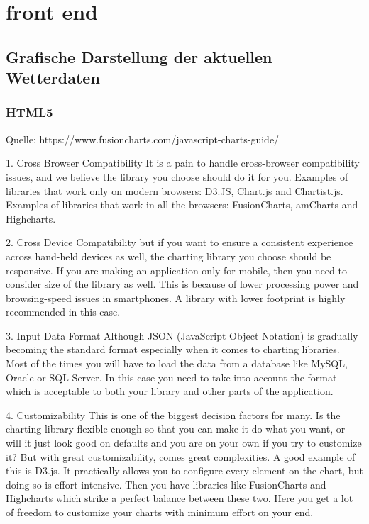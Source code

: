 \section{front end}

\subsection{Grafische Darstellung der aktuellen Wetterdaten}

\subsubsection*{HTML5}
Quelle: https://www.fusioncharts.com/javascript-charts-guide/


1. Cross Browser Compatibility
It is a pain to handle cross-browser compatibility issues, and we believe the library you choose should do it for you.
Examples of libraries that work only on modern browsers: D3.JS, Chart.js and Chartist.js.
Examples of libraries that work in all the browsers: FusionCharts, amCharts and Highcharts.

2. Cross Device Compatibility
but if you want to ensure a consistent experience across hand-held devices as well, the charting library you choose should be responsive.
If you are making an application only for mobile, then you need to consider size of the library as well. This is because of lower processing power and browsing-speed issues in smartphones. A library with lower footprint is highly recommended in this case.

3. Input Data Format
Although JSON (JavaScript Object Notation) is gradually becoming the standard format especially when it comes to charting libraries. Most of the times you will have to load the data from a database like MySQL, Oracle or SQL Server. In this case you need to take into account the format which is acceptable to both your library and other parts of the application.

4. Customizability
This is one of the biggest decision factors for many. Is the charting library flexible enough so that you can make it do what you want, or will it just look good on defaults and you are on your own if you try to customize it?
But with great customizability, comes great complexities. A good example of this is D3.js. It practically allows you to configure every element on the chart, but doing so is effort intensive. Then you have libraries like FusionCharts and Highcharts which strike a perfect balance between these two. Here you get a lot of freedom to customize your charts with minimum effort on your end.

